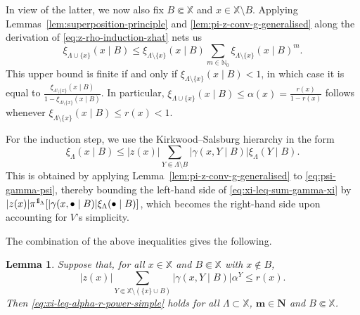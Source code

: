 \documentclass[reqno, 11pt]{amsart}
\newtheorem{lemma}[theorem]{Lemma}
\theoremstyle{definition}
\newcommand{\N}{\mathbb{N}}
\newcommand{\X}{\mathbb X}
\newcommand{\be}{\begin{equation}}
\newcommand{\ee}{\end{equation}}
\def\1{{\mathchoice {1\mskip-4mu\mathrm l}      
{1\mskip-4mu\mathrm l}
{1\mskip-4.5mu\mathrm l} {1\mskip-5mu\mathrm l}}}
\begin{document}
In view of the latter, we now also fix $B \Subset \X$ and $x \in \X \setminus B$. 
Applying Lemmas~\ref{lem:superposition-principle} and \ref{lem:pi-z-conv-g-generalised} along the derivation of \eqref{eq:z-rho-induction-zhat} nets us
\be \label{eq:xi-x-in-x-out}
	\xi_{\Lambda \cup \{x\}}(x \mid B) \leq \xi_{\Lambda \setminus \{x\}}(x \mid B) \sum_{m \in \N_0} \xi_{\Lambda \setminus \{x\}}(x \mid B)^m.
\ee
This upper bound is finite if and only if $\xi_{\Lambda \setminus \{x\}}(x \mid B) < 1$, in which case it is equal to $\frac{\xi_{\Lambda \setminus \{x\}}(x \mid B)}{1-\xi_{\Lambda \setminus \{x\}}(x \mid B)}$. 
In particular, $\xi_{\Lambda \cup \{x\}}(x \mid B) \leq \alpha(x) = \frac{r(x)}{1-r(x)}$ follows whenever $\xi_{\Lambda \setminus \{x\}}(x \mid B) \leq r(x) < 1$.

For the induction step, we use the Kirkwood--Salsburg hierarchy in the form
\be \label{eq:xi-leq-sum-gamma-xi}
	\xi_\Lambda(x \mid B) \leq |z(x)| \sum_{Y \Subset \Lambda \setminus B} |\gamma(x, Y \mid B)| \xi_\Lambda(Y \mid B).
\ee
This is obtained by applying Lemma~\ref{lem:pi-z-conv-g-generalised} to \eqref{eq:psi-gamma-psi}, thereby bounding the left-hand side of \eqref{eq:xi-leq-sum-gamma-xi} by $|z(x)| \pi^{\1_\Lambda}[|\gamma(x, \bullet \mid B)| \xi_\Lambda(\bullet \mid B)]$, which becomes the right-hand side upon accounting for $V$'s simplicity.

The combination of the above inequalities gives the following.

\begin{lemma} \label{lem:xi-KS-induction}
	Suppose that, for all $x \in \X$ and $B \Subset \X$ with $x \notin B$,
	\[
		|z(x)| \sum_{Y \Subset \X \setminus (\{x\} \cup B)} |\gamma(x, Y \mid B)| \alpha^Y \leq r(x).
	\]
	Then \eqref{eq:xi-leq-alpha-r-power-simple} holds for all $\Lambda \subset \X$, $\mathbf m \in \mathbf N$ and $B \Subset \X$.
\end{lemma}
\end{document}
